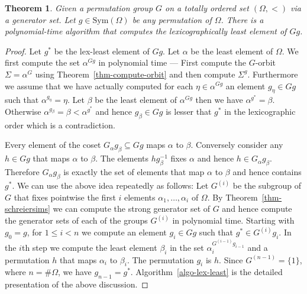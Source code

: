 \documentclass[11pt]{madras}%
\newtheorem{theorem}{Theorem}[chapter]
\theoremstyle{remark}
\newcommand{\Sym}[1]{{\ensuremath{\mathrm{Sym}\left(#1\right)}}}
\begin{document}
\begin{theorem}\label{thm-lexleast}
  Given a permutation group $G$ on a totally ordered set $(\Omega,<)$
  via a generator set. Let $g \in \Sym{\Omega}$ be any permutation of
  $\Omega$.  There is a polynomial-time algorithm that computes the
  lexicographically least element of $Gg$.
\end{theorem}

\begin{proof}
  Let $g^*$ be the lex-least element of $Gg$.  Let $\alpha$ be the
  least element of $\Omega$. We first compute the set $\alpha^{Gg}$ in
  polynomial time --- First compute the $G$-orbit $\Sigma = \alpha^G$
  using Theorem~\ref{thm-compute-orbit} and then compute $\Sigma^g$.
  Furthermore we assume that we have actually computed for each $\eta
  \in \alpha^{Gg}$ an element $g_\eta \in Gg$ such that
  $\alpha^{g_\eta} = \eta$.  Let $\beta$ be the least element of
  $\alpha^{Gg}$ then we have $\alpha^{g^*} = \beta$.  Otherwise
  $\alpha^{g_\beta} = \beta < \alpha^{g^*}$ and hence $g_\beta \in Gg$
  is lesser that $g^*$ in the lexicographic order which is a
  contradiction.  

  Every element of the coset $G_\alpha g_\beta \subseteq Gg$ maps
  $\alpha$ to $\beta$. Conversely consider any $h \in Gg$ that maps
  $\alpha$ to $\beta$. The elements $hg_\beta^{-1}$ fixes $\alpha$ and
  hence $h \in G_{\alpha}g_\beta$. Therefore $G_\alpha g_\beta$ is
  exactly the set of elements that map $\alpha$ to $\beta$ and hence
  contains $g^*$. We can use the above idea repeatedly as follows: Let
  $G^{(i)}$ be the subgroup of $G$ that fixes pointwise the first $i$
  elements $\alpha_1,\ldots,\alpha_i$ of $\Omega$. By
  Theorem~\ref{thm-schreiersims} we can compute the strong generator
  set of $G$ and hence compute the generator sets of each of the
  groups $G^{(i)}$ in polynomial time.  Starting with $g_0 = g$, for
  $1 \leq i < n$ we compute an element $g_i \in Gg$ such that $g^* \in
  G^{(i)}g_i$. In the $i$th step we compute the least element
  $\beta_i$ in the set $\alpha_i^{G^{(i-1)}g_{i-1}}$ and a permutation
  $h$ that maps $\alpha_i$ to $\beta_i$. The permutation $g_i$ is $h$.
  Since $G^{(n-1)} = \{ 1 \}$, where $n = \# \Omega$, we have $g_{n-1}
  = g^*$.  Algorithm~\ref{algo-lex-least} is the detailed presentation
  of the above discussion.
\end{proof}

% 
%
\end{document}
